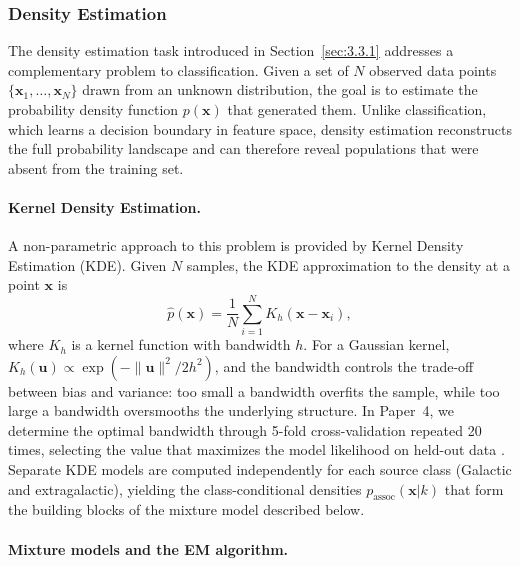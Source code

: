 \subsubsection{Density Estimation}
\label{sec:3.3.3}

The density estimation task introduced in Section~\ref{sec:3.3.1} addresses a complementary problem to classification. Given a set of $N$ observed data points $\{\mathbf{x}_1, \ldots, \mathbf{x}_N\}$ drawn from an unknown distribution, the goal is to estimate the probability density function $p(\mathbf{x})$ that generated them. Unlike classification, which learns a decision boundary in feature space, density estimation reconstructs the full probability landscape and can therefore reveal populations that were absent from the training set.

\paragraph{Kernel Density Estimation.}

A non-parametric approach to this problem is provided by Kernel Density Estimation (KDE). Given $N$ samples, the KDE approximation to the density at a point $\mathbf{x}$ is
\begin{equation}
\hat{p}(\mathbf{x}) = \frac{1}{N} \sum_{i=1}^{N} K_h(\mathbf{x} - \mathbf{x}_i),
\label{eq:kde}
\end{equation}
where $K_h$ is a kernel function with bandwidth $h$. For a Gaussian kernel, $K_h(\mathbf{u}) \propto \exp(-\|\mathbf{u}\|^2 / 2h^2)$, and the bandwidth controls the trade-off between bias and variance: too small a bandwidth overfits the sample, while too large a bandwidth oversmooths the underlying structure. In Paper~4, we determine the optimal bandwidth through 5-fold cross-validation repeated 20 times, selecting the value that maximizes the model likelihood on held-out data \cite{Amerio:2025sub}. Separate KDE models are computed independently for each source class (Galactic and extragalactic), yielding the class-conditional densities $p_\mathrm{assoc}(\mathbf{x}|k)$ that form the building blocks of the mixture model described below.

\paragraph{Mixture models and the EM algorithm.}


